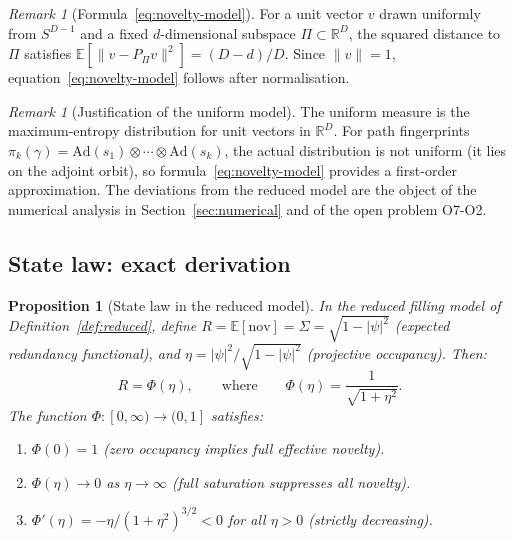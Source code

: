 \documentclass[11pt,a4paper]{article}
\newtheorem{proposition}[theorem]{Proposition}
\theoremstyle{definition}
\theoremstyle{remark}
\newtheorem{remark}[theorem]{Remark}
\newcommand{\Ad}{\mathrm{Ad}}
\newcommand{\nov}{\mathrm{nov}}
\begin{document}
    \begin{remark}[Formula~\eqref{eq:novelty-model}]
      \label{rem:novelty-formula}
      For a unit vector $v$ drawn uniformly from $S^{D-1}$ and a fixed $d$-dimensional subspace
      $\Pi \subset \mathbb{R}^D$, the squared distance to $\Pi$ satisfies
      $\mathbb{E}[\|v - P_\Pi v\|^2] = (D-d)/D$.
      Since $\|v\|=1$, equation~\eqref{eq:novelty-model} follows after normalisation.
    \end{remark}

    \begin{remark}[Justification of the uniform model]
      \label{rem:uniform-model}
      The uniform measure is the maximum-entropy distribution for unit vectors in $\mathbb{R}^D$.
      For path fingerprints $\pi_k(\gamma) = \Ad(s_1)\otimes\cdots\otimes\Ad(s_k)$, the actual
      distribution is not uniform (it lies on the adjoint orbit), so formula~\eqref{eq:novelty-model}
      provides a first-order approximation.
      The deviations from the reduced model are the object of the numerical analysis in
      Section~\ref{sec:numerical} and of the open problem O7-O2.
    \end{remark}

  \subsection{State law: exact derivation}
    \label{ssec:statelaw-derivation}

    \begin{proposition}[State law in the reduced model]
      \label{prop:statelaw}
      In the reduced filling model of Definition~\ref{def:reduced}, define
      $R = \mathbb{E}[\nov] = \Sigma = \sqrt{1-|\psi|^2}$ (expected redundancy functional),
      and $\eta = |\psi|^2/\sqrt{1-|\psi|^2}$ (projective occupancy).
      Then:
      \begin{equation}
        \label{eq:statelaw}
        R = \Phi(\eta),
        \qquad \text{where} \qquad
        \Phi(\eta) = \frac{1}{\sqrt{1+\eta^2}}.
      \end{equation}
      The function $\Phi : [0,\infty) \to (0,1]$ satisfies:
      \begin{enumerate}
        \item $\Phi(0) = 1$ \textup{(zero occupancy implies full effective novelty)}.
        \item $\Phi(\eta) \to 0$ as $\eta \to \infty$
        \textup{(full saturation suppresses all novelty)}.
        \item $\Phi'(\eta) = -\eta/(1+\eta^2)^{3/2} < 0$ for all $\eta > 0$
        \textup{(strictly decreasing)}.
      \end{enumerate}
    \end{proposition}
\end{document}

